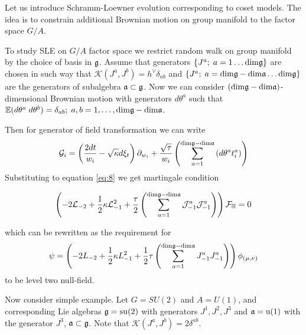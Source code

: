 Let us introduce Schramm-Loewner evolution corresponding to coset models. 
The idea is to constrain additional Brownian motion on group manifold to the factor space $G/A$. 


To study SLE on $G/A$ factor space we restrict random walk on group manifold by the choice of basis in $\mathfrak{g}$. Assume that generators $\{J^{a};\; a=1\dots \mathrm{dim}\mathfrak{g}\}$ are chosen in such way that $\mathcal{K}(J^{a},J^{b})=h^{\vee}\delta_{ab}$ and $\{J^{a};\; a=\mathrm{dim}\mathfrak{g}-\mathrm{dim}\mathfrak{a}\dots \mathrm{dim}\mathfrak{g}\}$ are the generators of subalgebra $\mathfrak{a}\subset \mathfrak{g}$. Now we can consider $(\mathrm{dim}\mathfrak{g}-\mathrm{dim}\mathfrak{a})$-dimensional Brownian motion with generators $d\theta^{a}$ such that $\mathbb{E}(d\theta^{a} \; d\theta^{b})=\delta_{ab};\; a,b=1,\dots,\mathrm{dim}\mathfrak{g}-\mathrm{dim}\mathfrak{a}$.

Then for generator of field transformation we can write 
\begin{equation}
  \mathcal{G}_{i}=\left(\frac{2dt}{w_{i}}-\sqrt{\kappa} d\xi_{t}\right) \partial_{w_{i}}+\frac{\sqrt{\tau}}{w_{i}}\left(\sum_{a=1}^{\mathrm{dim}\mathfrak{g}-\mathrm{dim}\mathfrak{a}}\left(d \theta ^{a} t^{a}_{i}\right)\right)
\label{eq:5}
\end{equation}
Substituting to equation \eqref{eq:8} we get martingale condition

\begin{equation}
  \left(-2 \mathcal{L}_{-2}+\frac{1}{2}\kappa \mathcal{L}_{-1}^{2}+\frac{\tau}{2}\left( \sum_{a=1}^{\mathrm{dim}\mathfrak{g}-\mathrm{dim}\mathfrak{a}} \mathcal{J}^{a}_{-1} \mathcal{J}^{a}_{-1}\right)\right)        \mathcal{F}_{\mathbb{H}}=0
\label{eq:9}
\end{equation}

which can be rewritten as the requirement for
\begin{equation}
  \psi=\left(-2L_{-2}+\frac{1}{2}\kappa L_{-1}^{2}+\frac{1}{2}\tau \left(\sum_{a=1}^{\mathrm{dim}\mathfrak{g}-\mathrm{dim}\mathfrak{a}}J^{a}_{-1}J^{a}_{-1}\right)\right) \phi_{(\mu,\nu)}
\label{eq:10}
\end{equation}
to be level two null-field. 

Now consider simple example. Let $G=SU(2)$ and $A=U(1)$, and corresponding Lie algebras $\mathfrak{g}=\mathrm{su}(2)$
with generators $J^{1},J^{2},J^{3}$ and $\mathfrak{a}=\mathrm{u}(1)$ with the generator $J^{3}$, $\mathfrak{a}\subset\mathfrak{g}$. Note that $\mathcal{K}(J^{a},J^{b})=2\delta^{ab}$. 

